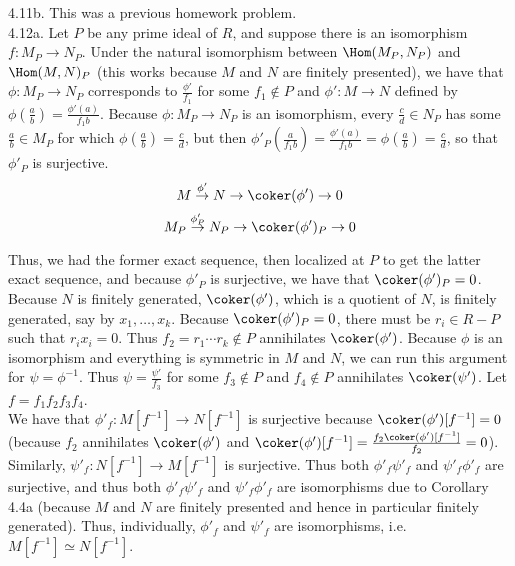 \documentclass[11pt]{article}
\begin{document}
\num{4.11b.} This was a previous homework problem.    \\

\num{4.12a.} Let $P$ be any prime ideal of $R$, and suppose there is an
isomorphism $f:M_P\rightarrow N_P$. Under the natural isomorphism between
$\Hom(M_P,N_P)$ and $\Hom(M,N)_P$ (this works because $M$ and $N$ are
finitely presented), we have that $\phi:M_P\rightarrow N_P$ corresponds
to $\frac{\phi'}{f_1}$ for some $f_1\notin P$ and  $\phi':M\rightarrow
N$ defined by $\phi(\frac{a}{b})=\frac{\phi'(a)}{f_1b}$. Because
$\phi:M_P\rightarrow N_P$ is an isomorphism, every $\frac{c}{d}\in N_P$ has
some $\frac{a}{b}\in M_P$ for which $\phi(\frac{a}{b})=\frac{c}{d}$, but then
$\phi'_P(\frac{a}{f_1b})=\frac{\phi'(a)}{f_1b}=\phi(\frac{a}{b})=\frac{c}{d}$,
so that $\phi'_P$ is surjective. 
\[M\stackrel{\phi'}{\rightarrow}N\rightarrow\coker(\phi')\rightarrow0\]
\[M_P\stackrel{\phi'_P}{\rightarrow}N_P\rightarrow\coker(\phi')_P\rightarrow0\]

Thus, we had the former exact sequence, then localized at $P$ to get the
latter exact sequence, and because $\phi'_P$ is surjective, we have that
$\coker(\phi')_P=0$. Because $N$ is finitely generated, $\coker(\phi')$, which
is a quotient of $N$, is finitely generated, say by $x_1,\ldots,x_k$. Because
$\coker(\phi')_P=0$, there must be $r_i\in R-P$ such that $r_ix_i=0$. Thus
$f_2=r_1\cdots r_k\notin P$ annihilates $\coker(\phi')$. Because $\phi$
is an isomorphism and everything is symmetric in $M$ and $N$, we can
run this argument for $\psi=\phi^{-1}$. Thus $\psi=\frac{\psi'}{f_3}$
for some $f_3\notin P$ and $f_4\notin P$ annihilates $\coker(\psi')$. Let
$f=f_1f_2f_3f_4$.     \\

We have that $\phi'_f:M[f^{-1}]\rightarrow N[f^{-1}]$ is surjective because
$\coker(\phi')[f^{-1}]=0$ (because $f_2$ annihilates $\coker(\phi')$ and
$\coker(\phi')[f^{-1}]=\frac{f_2\coker(\phi')[f^{-1}]}{f_2}=0$). Similarly,
$\psi'_f:N[f^{-1}]\rightarrow M[f^{-1}]$ is surjective. Thus both
$\phi'_f\psi'_f$ and $\psi'_f\phi'_f$ are surjective, and thus both
$\phi'_f\psi'_f$ and $\psi'_f\phi'_f$ are isomorphisms due to Corollary 4.4a
(because $M$ and $N$ are finitely presented and hence in particular finitely
generated). Thus, individually, $\phi'_f$ and $\psi'_f$ are isomorphisms,
i.e. $M[f^{-1}]\simeq N[f^{-1}]$.  \\
\end{document}
